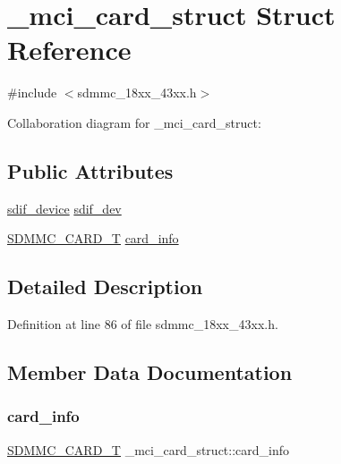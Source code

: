 \hypertarget{struct__mci__card__struct}{}\section{\+\_\+mci\+\_\+card\+\_\+struct Struct Reference}
\label{struct__mci__card__struct}


{\ttfamily \#include $<$sdmmc\+\_\+18xx\+\_\+43xx.\+h$>$}



Collaboration diagram for \+\_\+mci\+\_\+card\+\_\+struct\+:
\subsection*{Public Attributes}
\begin{DoxyCompactItemize}
\item 
\hyperlink{group___s_d_i_f__18_x_x__43_x_x_ga14a605aa797cde1201ae414437a32292}{sdif\+\_\+device} \hyperlink{struct__mci__card__struct_a5ab85d4fec588e64d0a726bf45da916e}{sdif\+\_\+dev}
\item 
\hyperlink{struct_s_d_m_m_c___c_a_r_d___t}{S\+D\+M\+M\+C\+\_\+\+C\+A\+R\+D\+\_\+T} \hyperlink{struct__mci__card__struct_ae36204a2bd8e6d828e5eb0150aad485d}{card\+\_\+info}
\end{DoxyCompactItemize}


\subsection{Detailed Description}


Definition at line 86 of file sdmmc\+\_\+18xx\+\_\+43xx.\+h.



\subsection{Member Data Documentation}
\mbox{\label{struct__mci__card__struct_ae36204a2bd8e6d828e5eb0150aad485d}} 
\subsubsection{\texorpdfstring{card\+\_\+info}{card\_info}}
{\footnotesize\ttfamily \hyperlink{struct_s_d_m_m_c___c_a_r_d___t}{S\+D\+M\+M\+C\+\_\+\+C\+A\+R\+D\+\_\+T} \+\_\+mci\+\_\+card\+\_\+struct\+::card\+\_\+info}



